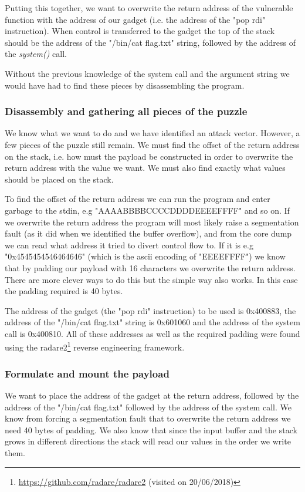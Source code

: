 Putting this together, we want to overwrite the return address of the vulnerable function
with the address of our gadget (i.e. the address of the "pop rdi" instruction). When control
is transferred to the gadget the top of the stack should be the address of the "/bin/cat flag.txt"
string, followed by the address of the \textit{system()} call.

Without the previous knowledge of the system call and the argument string we would have had
to find these pieces by disassembling the program.

\subsubsection{Disassembly and gathering all pieces of the puzzle}

We know what we want to do and we have identified an attack vector. However, a few pieces
of the puzzle still remain. We must find the offset of the return address on the stack,
i.e. how must the payload be constructed in order to overwrite the return address with the
value we want. We must also find exactly what values should be placed on the stack.

To find the offset of the return address we can run the program and enter garbage to the
stdin, e.g "AAAABBBBCCCCDDDDEEEEFFFF" and so on. If we overwrite the return address the
program will most likely raise a segmentation fault (as it did when we identified the
buffer overflow), and from the core dump we can read what address it tried to divert
control flow to. If it is e.g "0x4545454546464646" (which is the ascii encoding of
"EEEEFFFF") we know that by padding our payload with 16 characters we overwrite the return
address. There are more clever ways to do this but the simple way also works. In this case
the padding required is 40 bytes.

The address of the gadget (the "pop rdi" instruction) to be used is 0x400883, the address
of the "/bin/cat flag.txt" string is 0x601060 and the address of the system call is
0x400810. All of these addresses as well as the required padding were found using the
radare2\footnote{\url{https://github.com/radare/radare2} (visited on 20/06/2018)} reverse engineering framework.

\subsubsection{Formulate and mount the payload}

We want to place the address of the gadget at the return address, followed by the address
of the "/bin/cat flag.txt" followed by the address of the system call. We know from
forcing a segmentation fault that to overwrite the return address we need 40 bytes of
padding. We also know that since the input buffer and the stack grows in different
directions the stack will read our values in the order we write them.

